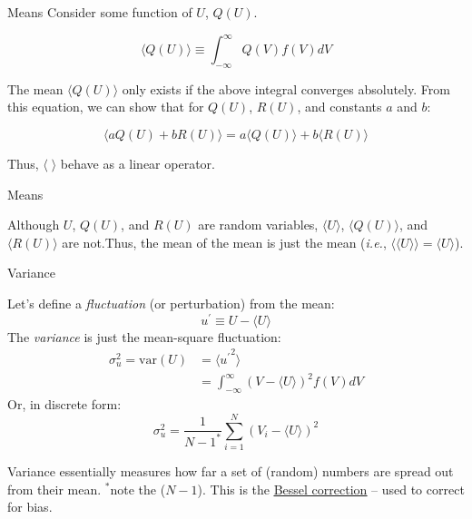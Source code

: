 
\begin{frame}{Means}
Consider some function of $U$, $Q(U)$.

$$\langle Q(U) \rangle \equiv \int^{\infty}_{-\infty} Q(V)f(V)dV$$

The mean $\langle Q(U) \rangle$ only exists if the above integral converges absolutely. From this equation, we can show that for $Q(U)$, $R(U)$, and constants $a$ and $b$:

$$\langle aQ(U) + bR(U) \rangle = a\langle Q(U) \rangle +  b\langle R(U) \rangle$$

Thus, $\langle \; \rangle$ behave as a linear operator.

\end{frame}


\begin{frame}{Means}

Although $U$, $Q(U)$, and $R(U)$ are random variables, $\langle U \rangle$, $\langle Q(U) \rangle$, and $\langle R(U) \rangle$ are not.\newline\newline Thus, the mean of the mean is just the mean (\textit{i.e.}, $\langle \langle U \rangle \rangle = \langle U \rangle$).

\end{frame}


\begin{frame}{Variance}

Let's define a \textit{fluctuation} (or perturbation) from the mean:
$$u^\prime \equiv U - \langle U \rangle$$
The \textit{variance} is just the mean-square fluctuation:
\begin{align*}
\sigma_u^2 = \text{var}(U) &= \langle {u^\prime}^2 \rangle\\
&= \int^{\infty}_{-\infty} (V - \langle U \rangle)^2 f(V) dV 
\end{align*}
Or, in discrete form:
$$\sigma_u^2 = \frac{1}{N-1^*} \sum^N_{i=1} (V_i - \langle U \rangle)^2$$

Variance essentially measures how far a set of (random) numbers are spread out from their mean.
\newline\newline
\scriptsize{$^*$note the ($N-1$). This is the \href{https://en.wikipedia.org/wiki/Bessel\%27s_correction}{\color{UUcrimson}\underline{Bessel correction}} -- used to correct for bias.}

\end{frame}

